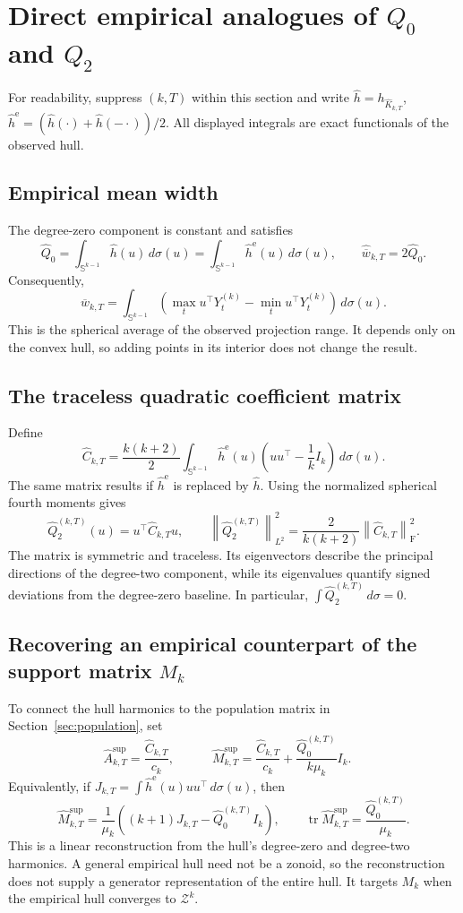 \documentclass[11pt,a4paper]{article}
\newcommand{\Sph}{\mathbb S}
\newcommand{\norm}[1]{\left\lVert #1\right\rVert}
\newcommand{\tr}{\operatorname{tr}}
\newcommand{\Frob}{\mathrm F}
\newcommand{\he}{\widehat h^{\mathrm e}}
\newcommand{\hh}{\widehat h}
\newcommand{\hQ}{\widehat Q}
\newcommand{\hC}{\widehat C}
\newcommand{\hM}{\widehat M}
\begin{document}
\newpage
\section{Direct empirical analogues of \texorpdfstring{$Q_0$ and $Q_2$}{Q0 and Q2}}\label{sec:empirical}
For readability, suppress $(k,T)$ within this section and write
$\hh=h_{\widehat K_{k,T}}$, $\he=(\hh(\cdot)+\hh(-\cdot))/2$.
All displayed integrals are exact functionals of the observed hull.

\subsection*{Empirical mean width}
The degree-zero component is constant and satisfies
\[
 \boxed{\quad
 \hQ_0=\int_{\Sph^{k-1}}\hh(u)\,d\sigma(u)
 =\int_{\Sph^{k-1}}\he(u)\,d\sigma(u),\qquad
 \widehat{\overline w}_{k,T}=2\hQ_0.
 \quad}
\]
Consequently,
\[
 \widehat{\overline w}_{k,T}
 =\int_{\Sph^{k-1}}\left(\max_tu^\top Y_t^{(k)}-
 \min_tu^\top Y_t^{(k)}\right)\,d\sigma(u).
\]
This is the spherical average of the observed projection range. It depends only on
the convex hull, so adding points in its interior does not change the result.

\subsection*{The traceless quadratic coefficient matrix}
Define
\[
 \boxed{\quad
 \hC_{k,T}=\frac{k(k+2)}2\int_{\Sph^{k-1}}
 \he(u)\left(uu^\top-\frac1kI_k\right)\,d\sigma(u).
 \quad}
\]
The same matrix results if $\he$ is replaced by $\hh$.
Using the normalized spherical fourth moments gives
\[
 \boxed{\quad
 \hQ_2^{(k,T)}(u)=u^\top\hC_{k,T}u,\qquad
 \norm{\hQ_2^{(k,T)}}_{L^2}^2=
 \frac{2}{k(k+2)}\norm{\hC_{k,T}}_{\Frob}^2.
 \quad}
\]
The matrix is symmetric and traceless. Its eigenvectors describe the principal
directions of the degree-two component, while its eigenvalues quantify signed
deviations from the degree-zero baseline. In particular,
$\int\hQ_2^{(k,T)}\,d\sigma=0$.

\subsection*{Recovering an empirical counterpart of the support matrix $M_k$}
To connect the hull harmonics to the population matrix in Section~\ref{sec:population}, set
\[
 \widehat A_{k,T}^{\mathrm{sup}}=\frac{\hC_{k,T}}{c_k},\qquad
 \boxed{\quad
 \hM_{k,T}^{\mathrm{sup}}=
 \frac{\hC_{k,T}}{c_k}+\frac{\hQ_0^{(k,T)}}{k\mu_k}I_k.
 \quad}
\]
Equivalently, if $J_{k,T}=\int\he(u)uu^\top\,d\sigma(u)$, then
\[
 \boxed{\quad
 \hM_{k,T}^{\mathrm{sup}}=
 \frac1{\mu_k}\left((k+1)J_{k,T}-\hQ_0^{(k,T)}I_k\right),\qquad
 \tr\hM_{k,T}^{\mathrm{sup}}=\frac{\hQ_0^{(k,T)}}{\mu_k}.
 \quad}
\]
This is a linear reconstruction from the hull's degree-zero and degree-two
harmonics. A general empirical hull need not be a zonoid, so the reconstruction
does not supply a generator representation of the entire hull.
It targets $M_k$ when the empirical hull converges to $\mathcal Z^k$.
\end{document}
